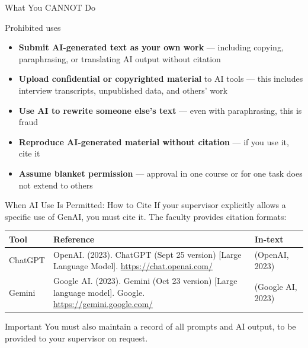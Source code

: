 \documentclass[aspectratio=169,11pt]{beamer}
\begin{document}
\begin{frame}{What You CANNOT Do}
    \begin{alertblock}{Prohibited uses}
        \begin{itemize}
            \item \textbf{Submit AI-generated text as your own work} --- including copying, paraphrasing, or translating AI output without citation
            \item \textbf{Upload confidential or copyrighted material} to AI tools --- this includes interview transcripts, unpublished data, and others' work
            \item \textbf{Use AI to rewrite someone else's text} --- even with paraphrasing, this is fraud
            \item \textbf{Reproduce AI-generated material without citation} --- if you use it, cite it
            \item \textbf{Assume blanket permission} --- approval in one course or for one task does not extend to others
        \end{itemize}
    \end{alertblock}
\end{frame}

\begin{frame}{When AI Use Is Permitted: How to Cite}
    If your supervisor explicitly allows a specific use of GenAI, you must cite it. The faculty provides citation formats:
    \vspace{0.3cm}
    \footnotesize
    \begin{table}
        \begin{tabular}{p{}p{}p{}}
            \toprule
            \textbf{Tool} & \textbf{Reference} & \textbf{In-text} \\
            \midrule
            ChatGPT & OpenAI. (2023). ChatGPT (Sept 25 version) [Large Language Model]. \url{https://chat.openai.com/} & (OpenAI, 2023) \\
            \addlinespace
            Gemini & Google AI. (2023). Gemini (Oct 23 version) [Large language model]. Google. \url{https://gemini.google.com/} & (Google AI, 2023) \\
            \bottomrule
        \end{tabular}
    \end{table}
    \normalsize
    \vspace{0.3cm}
    \begin{block}{Important}
        You must also maintain a record of all prompts and AI output, to be provided to your supervisor on request.
    \end{block}
\end{frame}
\end{document}
